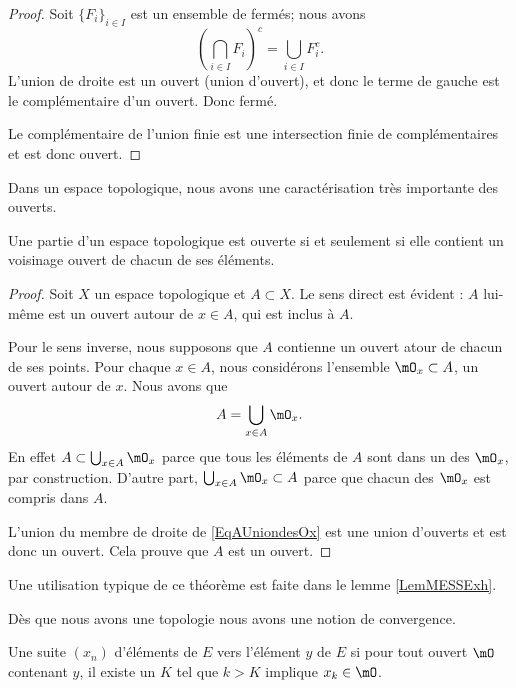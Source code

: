 \begin{proof}
    Soit \( \{ F_i \}_{i\in I} \) est un ensemble de fermés; nous avons
    \begin{equation}
        \left( \bigcap_{i\in I}F_i \right)^c=\bigcup_{i\in I}F_i^c.
    \end{equation}
    L'union de droite est un ouvert (union d'ouvert), et donc le terme de gauche est le complémentaire d'un ouvert. Donc fermé.

    Le complémentaire de l'union finie est une intersection finie de complémentaires et est donc ouvert.
\end{proof}

Dans un espace topologique, nous avons une caractérisation très importante des ouverts.
\begin{theorem}		\label{ThoPartieOUvpartouv}
    Une partie d'un espace topologique est ouverte si et seulement si elle contient un voisinage ouvert de chacun de ses éléments.
\end{theorem}

\begin{proof} 
    Soit \( X\) un espace topologique et \( A\subset X\). Le sens direct est évident : $A$ lui-même est un ouvert autour de $x\in A$, qui est inclus à $A$.

Pour le sens inverse, nous supposons que \( A\) contienne un ouvert atour de chacun de ses points. Pour chaque $x\in A$, nous considérons l'ensemble $\mO_x\subset A$, un ouvert autour de $x$. Nous avons que
\begin{equation}	\label{EqAUniondesOx}
	A=\bigcup_{x\in A}\mO_x.
\end{equation}
En effet $A\subset\bigcup_{x\in A}\mO_x$ parce que tous les éléments de $A$ sont dans un des $\mO_x$, par construction. D'autre part, $\bigcup_{x\in A}\mO_x\subset A$ parce que chacun des $\mO_x$ est compris dans $A$.

L'union du membre de droite de \eqref{EqAUniondesOx} est une union d'ouverts et est donc un ouvert. Cela prouve que $A$ est un ouvert.

\end{proof}
Une utilisation typique de ce théorème est faite dans le lemme \ref{LemMESSExh}.

Dès que nous avons une topologie nous avons une notion de convergence.
\begin{definition} \label{DefXSnbhZX}
    Une suite $(x_n)$ d'éléments de $E$  vers l'élément $y$ de $E$ si pour tout ouvert $\mO$ contenant $y$, il existe un $K$ tel que $k>K$ implique $x_k\in\mO$. 
\end{definition}

